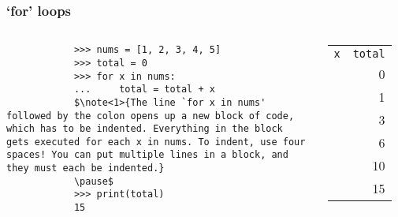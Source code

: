 \documentclass[notes]{beamer}
\begin{document}
	\begin{frame}[fragile]
		\frametitle{`for' loops}
		
		\begin{columns}[c]
			\begin{lstlisting}
			>>> nums = [1, 2, 3, 4, 5]
			>>> total = 0
			>>> for x in nums:
			... 	total = total + x
			$\note<1>{The line `for x in nums' followed by the colon opens up a new block of code, which has to be indented. Everything in the block gets executed for each x in nums. To indent, use four spaces! You can put multiple lines in a block, and they must each be indented.}
			\pause$
			>>> print(total)
			15
			\end{lstlisting}
			
			\pause
			\begin{tabular}{l | r}
				\lstinline|x| & \lstinline|total| \\
				\, & 0 \\ \pause
				1 & 1 \\ \pause
				2 & 3 \\ \pause
				3 & 6 \\ \pause
				4 & 10 \\ \pause
				5 & 15 \\
			\end{tabular}
		\end{columns}
		
		
	\end{frame}
	
\end{document}
